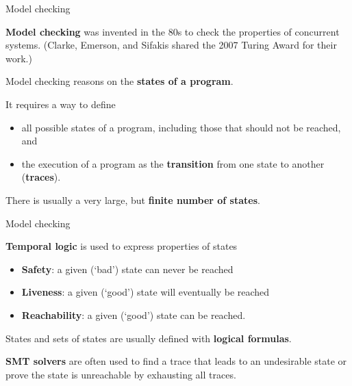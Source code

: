 \documentclass[compress,dvipdfmx]{beamer}
\begin{document}
\begin{frame}{Model checking}

  \textbf{Model checking} was invented in the 80s to check the
  properties of concurrent systems.  (Clarke, Emerson, and Sifakis
  shared the 2007 Turing Award for their work.)

  \bigskip

  Model checking reasons on the \textbf{states of a program}.

  \bigskip

  It requires a way to define
  \begin{itemize}

    \item all possible states of a program, including those that
      should not be reached, and

    \item the execution of a program as the \textbf{transition} from
      one state to another (\textbf{traces}).

  \end{itemize}

  \medskip

  There is usually a very large, but \textbf{finite number of states}.

\end{frame}


\begin{frame}{Model checking}

  \textbf{Temporal logic} is used to express properties of states
  \begin{itemize}

    \item \textbf{Safety}: a given (`bad') state can never be
      reached

    \item \textbf{Liveness}: a given (`good') state will eventually
      be reached

    \item \textbf{Reachability}: a given (`good') state can be
      reached.

  \end{itemize}

  \medskip

  States and sets of states are usually defined with \textbf{logical
    formulas}.

  \bigskip

  \textbf{SMT solvers} are often used to find a trace that leads to an
  undesirable state or prove the state is unreachable by exhausting
  all traces.

\end{frame}
\end{document}
